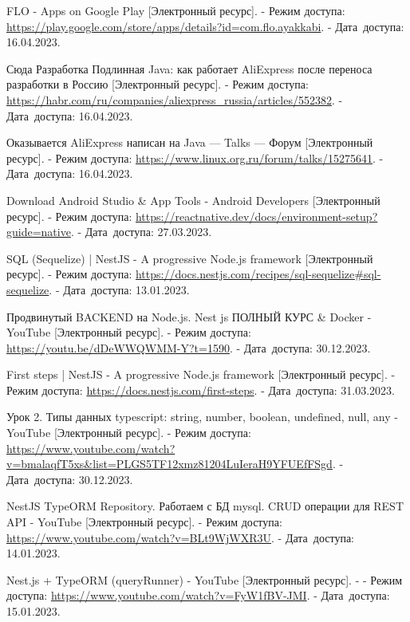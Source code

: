 \begin{thebibliography}{}
    FLO - Apps on Google Play
    [Электронный ресурс].
    - Режим доступа: \url{https://play.google.com/store/apps/details?id=com.flo.ayakkabi}.
    - Дата~доступа: 16.04.2023.

    Сюда Разработка Подлинная Java: как работает AliExpress после переноса разработки в Россию
    [Электронный ресурс].
    - Режим доступа: \url{https://habr.com/ru/companies/aliexpress_russia/articles/552382}.
    - Дата~доступа: 16.04.2023.

    Оказывается AliExpress написан на Java — Talks — Форум
    [Электронный ресурс].
    - Режим доступа: \url{https://www.linux.org.ru/forum/talks/15275641}.
    - Дата~доступа: 16.04.2023.

    Download Android Studio \& App Tools - Android Developers
    [Электронный ресурс].
    - Режим доступа: \url{https://reactnative.dev/docs/environment-setup?guide=native}.
    - Дата~доступа: 27.03.2023.

    SQL (Sequelize) | NestJS - A progressive Node.js framework
    [Электронный ресурс].
    - Режим доступа: \url{https://docs.nestjs.com/recipes/sql-sequelize#sql-sequelize}.
    - Дата~доступа: 13.01.2023.

    Продвинутый BACKEND на Node.js. Nest js ПОЛНЫЙ КУРС \& Docker - YouTube
    [Электронный ресурс].
    - Режим доступа: \url{https://youtu.be/dDeWWQWMM-Y?t=1590}.
    - Дата~доступа: 30.12.2023.

    First steps | NestJS - A progressive Node.js framework
    [Электронный ресурс].
    - Режим доступа: \url{https://docs.nestjs.com/first-steps}.
    - Дата~доступа: 31.03.2023.

    Урок 2. Типы данных typescript: string, number, boolean, undefined, null, any - YouTube
    [Электронный ресурс].
    - Режим доступа: \url{https://www.youtube.com/watch?v=bmalaqfT5xs&list=PLGS5TF12xmz81204LuIeraH9YFUEfFSgd}.
    - Дата~доступа: 30.12.2023.

    NestJS TypeORM Repository. Работаем с БД mysql. CRUD операции для REST API - YouTube
    [Электронный ресурс].
    - Режим доступа: \url{https://www.youtube.com/watch?v=BLt9WjWXR3U}.
    - Дата~доступа: 14.01.2023.

    Nest.js + TypeORM (queryRunner) - YouTube
    [Электронный ресурс]. -
    - Режим доступа: \url{https://www.youtube.com/watch?v=FyW1fBV-JMI}.
    - Дата~доступа: 15.01.2023.


\end{thebibliography}
